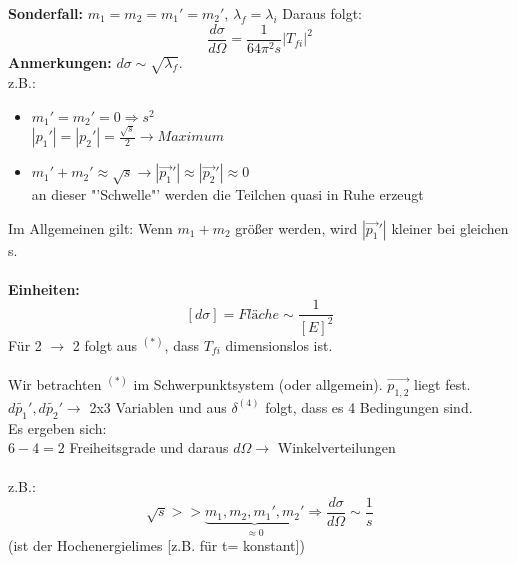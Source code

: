 \textbf{Sonderfall:} $m_1 = m_2 = m_1' = m_2'$, $\lambda_f = \lambda_i$ 
Daraus folgt:
\[ \frac{d\sigma}{d\Omega} = \frac{1}{64 \pi^2 s} {\left| T_{fi} \right|}^2 \]
\textbf{Anmerkungen:} $d\sigma \sim \sqrt{\lambda_f}$. \\
z.B.: \begin{itemize}
	\item $m_1' = m_2' = 0 \Rightarrow s^2$ \\
	$\left| p_1' \right| = \left| p_2' \right| = \frac{\sqrt{s}}{2} \rightarrow 
	\textit{Maximum} $
	\item $m_1' + m_2' \approx \sqrt{s} \rightarrow \left| \vec{p_1}' \right| 
	\approx \left| \vec{p_2}' \right| \approx 0$ \\
	an dieser "'Schwelle"' werden die Teilchen quasi in Ruhe erzeugt
\end{itemize}
Im Allgemeinen gilt: Wenn $m_1 + m_2$ größer werden, wird $\left| \vec{p_1}' 
\right|$ kleiner bei gleichen s. \\
\\
\textbf{Einheiten:} 
\[ \left[ d\sigma \right] = \mathit{Fläche} \sim \frac{1}{{\left[ E \right]}^2} 
\]
Für 2 $\to$ 2 folgt aus $ ^{(*)}$, dass $T_{fi}$ dimensionslos ist. \\
\\
Wir betrachten $ ^{(*)}$ im Schwerpunktsystem (oder allgemein). $\vec{p_{1,2}}$ 
liegt fest. \\
$d\tilde{p_1}', d\tilde{p_2}' \to$ 2x3 Variablen und aus $\delta^{(4)}$ folgt, 
dass es 4 Bedingungen sind. \\
Es ergeben sich: \\
$6-4 =2 $ Freiheitsgrade und daraus $d\Omega \to$ Winkelverteilungen \\
\\
z.B.: 
\[ \sqrt{s} >>\underbrace{ m_1, m_2, m_1', m_2'}_{\approx 0} \Rightarrow 
\frac{d\sigma}{d\Omega} \sim \frac{1}{s}\] (ist der Hochenergielimes [z.B. für 
t= konstant])